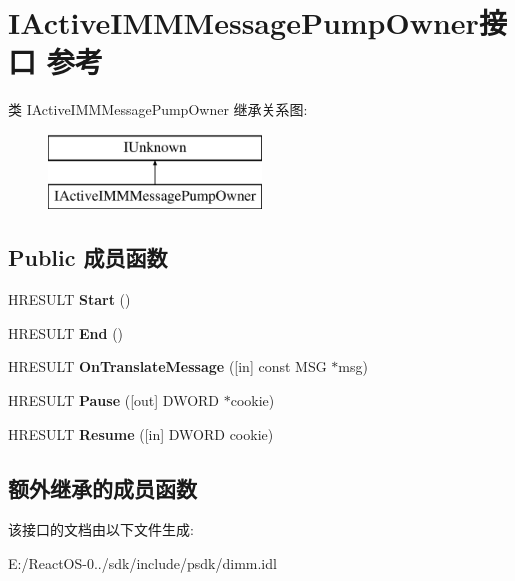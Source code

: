 \hypertarget{interface_i_active_i_m_m_message_pump_owner}{}\section{I\+Active\+I\+M\+M\+Message\+Pump\+Owner接口 参考}
\label{interface_i_active_i_m_m_message_pump_owner}
类 I\+Active\+I\+M\+M\+Message\+Pump\+Owner 继承关系图\+:\begin{figure}[H]
\begin{center}
\leavevmode
\includegraphics[height=2.000000cm]{interface_i_active_i_m_m_message_pump_owner}
\end{center}
\end{figure}
\subsection*{Public 成员函数}
\begin{DoxyCompactItemize}
\item 
\mbox{\label{interface_i_active_i_m_m_message_pump_owner_a747c6cc6ff1fbdcdb037c040b762e71e}} 
H\+R\+E\+S\+U\+LT {\bfseries Start} ()
\item 
\mbox{\label{interface_i_active_i_m_m_message_pump_owner_a45dbcfd316fb219b8a8a53f3c3196075}} 
H\+R\+E\+S\+U\+LT {\bfseries End} ()
\item 
\mbox{\label{interface_i_active_i_m_m_message_pump_owner_a074e2eefa275893647753c9e19e4c5f0}} 
H\+R\+E\+S\+U\+LT {\bfseries On\+Translate\+Message} (\mbox{[}in\mbox{]} const M\+SG $\ast$msg)
\item 
\mbox{\label{interface_i_active_i_m_m_message_pump_owner_afec6504b96c0dab19df44e81e89b88b5}} 
H\+R\+E\+S\+U\+LT {\bfseries Pause} (\mbox{[}out\mbox{]} D\+W\+O\+RD $\ast$cookie)
\item 
\mbox{\label{interface_i_active_i_m_m_message_pump_owner_aabbdaf92f10d9d3b3c66a7caab114a6c}} 
H\+R\+E\+S\+U\+LT {\bfseries Resume} (\mbox{[}in\mbox{]} D\+W\+O\+RD cookie)
\end{DoxyCompactItemize}
\subsection*{额外继承的成员函数}


该接口的文档由以下文件生成\+:\begin{DoxyCompactItemize}
\item 
E\+:/\+React\+O\+S-\/0../sdk/include/psdk/dimm.\+idl\end{DoxyCompactItemize}
